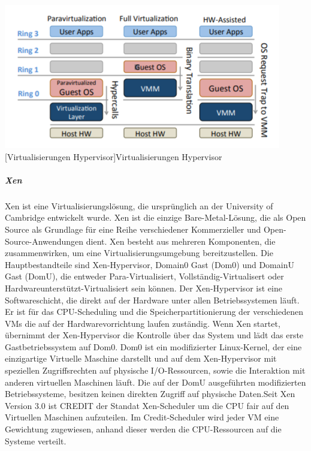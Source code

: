 \vspace{1em}
\begin{minipage}{\linewidth}
	\centering
	\includegraphics[width=1\linewidth]{pics/Virtualisierungen_Hypervisor.PNG}
	[Virtualisierungen Hypervisor]{Virtualisierungen Hypervisor \cite{Fayyad-Kazan2013BenchmarkingHypervisors}}
	\label{fig:Virtualisierungen_Hypervisor}
\end{minipage}

\subparagraph {Xen}
Xen ist eine Virtualisierungslösung, die ursprünglich an der University of Cambridge entwickelt wurde. Xen ist die einzige Bare-Metal-Lösung, die als Open Source als Grundlage für eine Reihe verschiedener Kommerzieller und Open-Source-Anwendungen dient. Xen besteht aus mehreren Komponenten, die zusammenwirken, um eine Virtualisierungsumgebung bereitzustellen. Die Hauptbestandteile sind Xen-Hypervisor, Domain0 Gast (Dom0) und DomainU Gast (DomU), die entweder Para-Virtualisiert, Vollständig-Virtualisert oder Hardwareunterstützt-Virtualisiert sein können. Der Xen-Hypervisor ist eine Softwareschicht, die direkt auf der Hardware unter allen Betriebssystemen läuft. Er ist für das CPU-Scheduling und die Speicherpartitionierung der verschiedenen VMs die auf der Hardwarevorrichtung laufen zuständig. Wenn Xen startet, übernimmt der Xen-Hypervisor die Kontrolle über das System und lädt das erste Gastbetriebssystem auf Dom0. Dom0 ist ein modifizierter Linux-Kernel, der eine einzigartige Virtuelle Maschine darstellt und auf dem Xen-Hypervisor mit speziellen Zugriffsrechten auf physische I/O-Ressourcen, sowie die Interaktion mit anderen virtuellen Maschinen läuft. Die auf der DomU ausgeführten modifizierten Betriebssysteme, besitzen keinen direkten Zugriff auf physische Daten.Seit Xen Version 3.0 ist CREDIT der Standat Xen-Scheduler um die CPU fair auf den Virtuellen Maschinen aufzuteilen. Im Credit-Scheduler wird jeder VM eine Gewichtung zugewiesen, anhand dieser werden die CPU-Ressourcen auf die Systeme verteilt\cite{Fayyad-Kazan2013BenchmarkingHypervisors}. 

